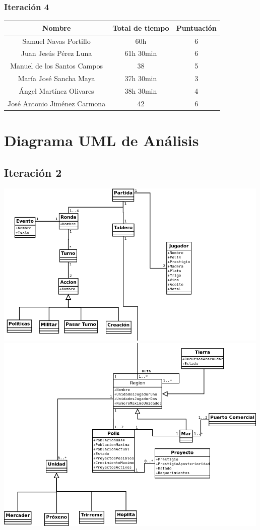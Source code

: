 \documentclass[11 pt]{book}
\begin{document}
		\subsection*{Iteración 4}			
			\begin{tabular}{|c|c|c|}
				\hline
				Nombre & Total de tiempo & Puntuación\\
				\hline
				Samuel Navas Portillo & 60h & 6\\
				Juan Jesús Pérez Luna & 61h 30min & 6\\
				Manuel de los Santos Campos & 38 & 5\\
				María José Sancha Maya & 37h 30min & 3\\
				Ángel Martínez Olivares & 38h 30min & 4\\
				José Antonio Jiménez Carmona & 42 & 6\\
				\hline
			\end{tabular}
			
\chapter{Diagrama UML de Análisis}
	\section*{Iteración 2}
		\begin{center}
			\includegraphics[width=500px]{analysis-uml/iteration2/part1.png}
			\includegraphics[width=500px]{analysis-uml/iteration2/part2.png}
		\end{center}
\end{document}

